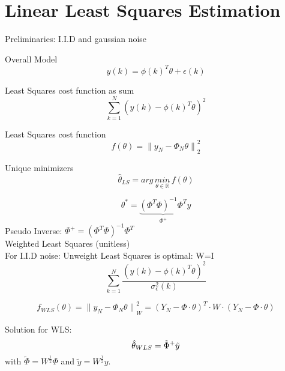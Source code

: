 \section*{Linear Least Squares Estimation}
Preliminaries: I.I.D and gaussian noise

Overall Model
\begin{equation*}
y(k)={ \phi (k) }^{ T }\theta +\epsilon (k)
\end{equation*}

Least Squares cost function as sum
\begin{equation*}
\sum _{ k=1 }^{ N }{{ (y(k)-{ \phi (k) }^{ T }\theta )}^{2  } } 
\end{equation*}

Least Squares cost function
\begin{equation*}
f(\theta )={ \parallel {y  }_{N  }-{ \Phi }_{ N }\theta\parallel }_{ 2 }^{2  }
\end{equation*}

Unique minimizers
\begin{equation*}
\hat{\theta}_{LS} =arg \, \underset{ \theta \in \mathbb{R} }{ min } \, f(\theta)
\end{equation*}

\begin{equation*}
{ \theta  }^{ * }=\underbrace { { ({ \Phi  }^{ T }\Phi ) }^{ -1 }{ \Phi  }^{ T } }_{ { \Phi  }^{ + } } y
\end{equation*}
Pseudo Inverse: \qquad $\Phi ^{ + }={({ \Phi  }^{ T }\Phi ) }^{ -1 }{ \Phi  }^{ T }$\\

Weighted Least Squares (unitless)\\
For I.I.D noise: Unweight Least Squares is optimal: W=I
\begin{equation*}
\sum _{ k=1 }^{ N }\frac {{{ (y(k)-{ \phi (k) }^{ T }\theta )}^{2  } }}{\sigma_{\epsilon}^{2}(k)}
\end{equation*}


\begin{equation*}
{ f }_{ WLS }(\theta )={ \parallel { y }_{ N }-{ \Phi  }_{ N }\theta \parallel  }_{ W }^{ 2 }={ ({ Y }_{ N }-\Phi \cdot \theta ) }^{ T }\cdot W\cdot  ({ Y }_{ N }-\Phi \cdot \theta )
\end{equation*}

Solution for WLS:
\begin{equation*}
\hat{\theta}_{WLS} = \tilde{\Phi}^+\tilde{y} \\
\end{equation*}
with $\tilde{\Phi} = W^{\frac{1}{2}} \Phi$ and $\tilde{y} = W^{\frac{1}{2}} y$.


